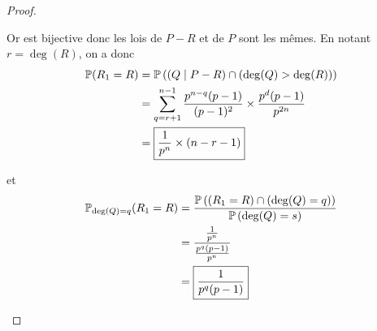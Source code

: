 \documentclass[12pt]{article}
\begin{document}
\begin{proof}
\begin{enumerate}
        Or 
        est bijective donc les lois de $P-R$ et de $P$ sont les mêmes. En notant $r=\deg(R)$, on a donc 
        \begin{align}
            \P(R_{1}=R)
            &=\P\left((Q\mid P-R)\cap(\deg(Q)>\deg(R))\right)\\
            &=\sum_{q=r+1}^{n-1}\frac{p^{n-q}(p-1)}{(p-1)^{2}}\times\frac{p^{d}(p-1)}{p^{2n}}\\
            &=\boxed{\frac{1}{p^{n}}\times(n-r-1)}
        \end{align}

        et 
        \begin{align}
            \P_{\deg(Q)=q}(R_{1}=R)
            &=\frac{\P\left((R_{1}=R)\cap(\deg(Q)=q)\right)}{\P\left(\deg(Q)=s\right)}\\
            &=\frac{\frac{1}{p^{n}}}{\frac{p^{q}(p-1)}{p^{n}}}\\
            &=\boxed{\frac{1}{p^{q}(p-1)}}
        \end{align}
    \end{enumerate}
\end{proof}
\end{document}
